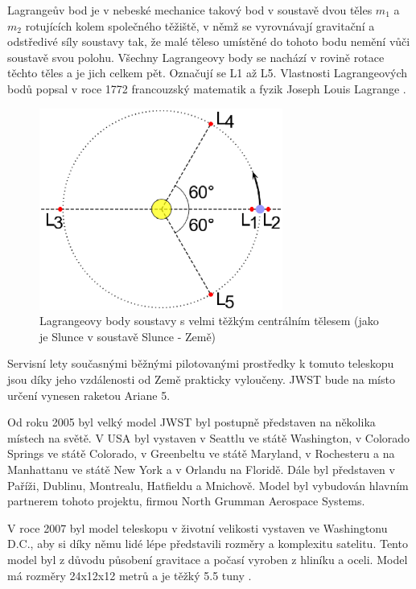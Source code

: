 \documentclass[a4paper,11pt]{article}
\begin{document}
Lagrangeův bod je v nebeské mechanice takový bod v soustavě dvou těles \begin{math}m_1\end{math} a \begin{math}m_2\end{math} rotujících kolem společného těžiště, v němž se vyrovnávají gravitační a odstředivé síly soustavy tak, že malé těleso umístěné do tohoto bodu nemění vůči soustavě svou polohu. Všechny Lagrangeovy body se nachází v rovině rotace těchto těles a je jich celkem pět. Označují se L1 až L5. Vlastnosti Lagrangeových bodů popsal v roce 1772 francouzský matematik a fyzik Joseph Louis Lagrange \cite{lagrange}.
\begin{figure}[h]
\begin{center}
\includegraphics[width=8cm]{lagrange.eps}
\caption{Lagrangeovy body soustavy s velmi těžkým centrálním tělesem (jako je Slunce v soustavě Slunce - Země)}
\end{center}
\end{figure}

Servisní lety současnými běžnými pilotovanými prostředky k tomuto teleskopu jsou díky jeho vzdálenosti od Země prakticky vyloučeny. JWST bude na místo určení vynesen raketou Ariane 5.

Od roku 2005 byl velký model JWST byl postupně představen na několika místech na světě. V USA byl vystaven v Seattlu ve státě Washington, v Colorado Springs ve státě Colorado, v Greenbeltu ve státě Maryland, v Rochesteru a na Manhattanu ve státě New York a v Orlandu na Floridě. Dále byl představen v Paříži, Dublinu, Montrealu, Hatfieldu a Mnichově. Model byl vybudován hlavním partnerem tohoto projektu, firmou North Grumman Aerospace Systems.

V roce 2007 byl model teleskopu v životní velikosti vystaven ve Washingtonu D.C., aby si díky němu lidé lépe představili rozměry a komplexitu satelitu. Tento model byl z důvodu působení gravitace a počasí vyroben z hliníku a oceli. Model má rozměry 24x12x12 metrů a je těžký 5.5 tuny \cite{wikipediaWebbEn}.
\end{document}
